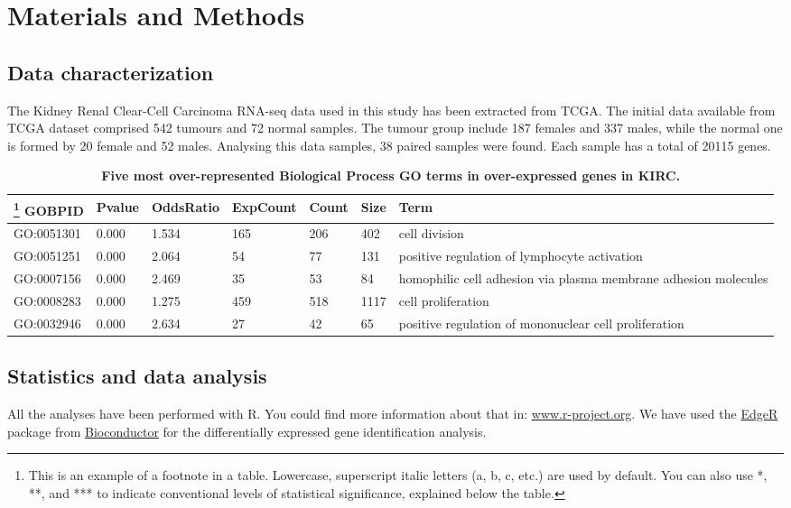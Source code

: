 \documentclass[9pt,twocolumn,twoside]{gsajnl}
\begin{document}
\section*{Materials and Methods}
\subsection*{Data characterization}
The Kidney Renal Clear-Cell Carcinoma RNA-seq data used in this study has been extracted from TCGA. The initial data available from TCGA dataset comprised 542 tumours and 72 normal samples. The tumour group include 187 females and 337 males, while the normal one is formed by 20 female and 52 males. Analysing this data samples, 38 paired samples were found. Each sample has a total of 20115 genes. 

\newcolumntype{b}{X}
\begin{table}[htbp]
\centering
\caption{\bf Five most over-represented Biological Process GO terms in over-expressed genes in KIRC. }
\begin{tableminipage}{\textwidth}
\begin{tabularx}{\textwidth}{ssssssb}
\hline
\footnote{This is an example of a footnote in a table. Lowercase, superscript italic letters (a, b, c, etc.) are used by default. You can also use *, **, and *** to indicate conventional levels of statistical significance, explained below the table.}
GOBPID & Pvalue & OddsRatio & ExpCount & Count & Size & Term\\
\hline
GO:0051301 & 0.000 & 1.534 & 165 & 206 & 402 & cell division\\
GO:0051251 & 0.000 & 2.064 & 54 & 77 & 131 & positive regulation of lymphocyte activation\\
GO:0007156 & 0.000 & 2.469 & 35 & 53 & 84 & homophilic cell adhesion via plasma membrane adhesion molecules\\
GO:0008283 & 0.000 & 1.275 & 459 & 518 & 1117 & cell proliferation\\
GO:0032946 & 0.000 & 2.634 & 27 & 42 & 65 & positive regulation of mononuclear cell proliferation\\
\hline
\end{tabularx}
\end{tableminipage}
\label{table:1}
\end{table}

\subsection*{Statistics and data analysis}
All the analyses have been performed with R. You could find more information about that in: \url{www.r-project.org}. We have used the \href{https://bioconductor.org/packages/release/bioc/html/edgeR.html}{EdgeR} \citep{Robinson2010} package from \href{https://bioconductor.org}{Bioconductor} \citep{Gentleman2004}  for the differentially expressed gene identification analysis.
\end{document}
